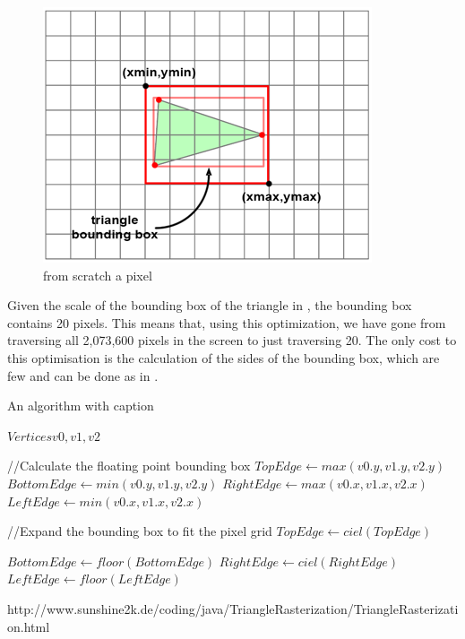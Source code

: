\begin{figure}[ht]
    \centering
    \includegraphics{lit_review/images/triangleBoundingBox.png}
    \caption{from scratch a pixel}
    \label{fig:triangleBoundingBox}
\end{figure}

Given the scale of the bounding box of the triangle in , the bounding box contains 20 pixels. This means that, using this optimization, we have gone from traversing all 2,073,600 pixels in the screen to just traversing 20. 
The only cost to this optimisation is the calculation of the sides of the bounding box, which are few and can be done as in .

\begin{algorithm}
\caption{An algorithm with caption}\label{algorithm:calculateBoundingBox}
\begin{algorithmic}


\State $Vertices v0,v1,v2$

//Calculate the floating point bounding box
\State $TopEdge    \gets max(v0.y, v1.y, v2.y)$
\State $BottomEdge \gets min(v0.y, v1.y, v2.y)$
\State $RightEdge  \gets max(v0.x, v1.x, v2.x)$
\State $LeftEdge   \gets min(v0.x, v1.x, v2.x)$

//Expand the bounding box to fit the pixel grid
\State $TopEdge    \gets ciel(TopEdge)$ 

\State $BottomEdge \gets floor(BottomEdge)$
\State $RightEdge  \gets ciel(RightEdge)$
\State $LeftEdge   \gets floor(LeftEdge)$
            
\end{algorithmic}
\end{algorithm}

http://www.sunshine2k.de/coding/java/TriangleRasterization/TriangleRasterization.html

